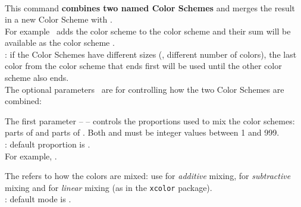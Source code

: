 \subsubsection*{}{\pgfPTMlibsubsubsection{\tmpSection}}\vspace{6pt}%
\label{command:pgfPTCScombine}%
%
\\ [10pt]This command \textbf{combines two named Color Schemes} and merges the result in a new Color Scheme with .
\\ For example \lb{}\rb\ adds the color scheme  to the color scheme  and their sum will be available as the color scheme .
\\ [3pt]: if the Color Schemes have different sizes (\ie, different number of colors), the last color from the color scheme that ends first will be used until the other color scheme also ends.
\\ [3pt]The optional parameters \lp{}\rp\ are for controlling how the two Color Schemes are combined:
\vspace{4pt}%
\begin{itemlist}
\item The first parameter --  -- controls the proportions used to mix the color schemes:  parts of  and  parts of  .  Both  and  must be integer values between 1 and 999.
\\ [3pt]: default proportion is .
\\ For example,  .
\item The  refers to how the colors are mixed: use  for \textit{additive} mixing,  for \textit{subtractive} mixing and  for \textit{linear} mixing (as in the \texttt{\large xcolor} package).
\\ [3pt]: default mode is .
\end{itemlist}
